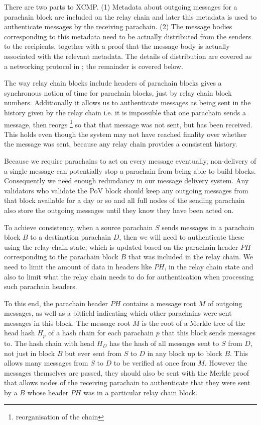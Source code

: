 There are two parts to XCMP. (1) Metadata about outgoing messages for a parachain block are included on the relay chain and later this metadata is used to authenticate messages by the receiving parachain. (2) The message bodies corresponding to this metadata need to be actually distributed from the senders to the recipients, together with a proof that the message body is actually associated with the relevant metadata. The details of distribution are covered as a networking protocol in ; the remainder is covered below.

The way relay chain blocks include headers of parachain blocks gives a synchronous notion of time for parachain blocks, just by relay chain block numbers. Additionally it allows us to authenticate messages as being sent in the history given by the relay chain i.e. it is impossible that one parachain sends a message, then reorgs \footnote{reorganisation of the chain} so that that message was not sent, but has been received. This holds even though the system may not have reached finality over whether the message was sent, because any relay chain provides a consistent history.

Because we require parachains to act on every message eventually, non-delivery of a single message can potentially stop a parachain from being able to build blocks. Consequently we need enough redundancy in our message delivery system. Any validators who validate the PoV block should keep any outgoing messages from that block available for a day or so and all full nodes of the sending parachain also store the outgoing messages until they know they have been acted on.

To achieve consistency, when a source parachain $S$ sends messages in a parachain block $B$ to a destination parachain $D$, then we will need to authenticate these using the relay chain state, which is updated based on the parachain header $PH$ corresponding to the parachain block $B$ that was included in the relay chain. We need to limit the amount of data in headers like $PH$, in the relay chain state and also to limit what the relay chain needs to do for authentication when processing such parachain headers.

To this end, the parachain header $PH$ contains a message root $M$ of outgoing messages, as well as a bitfield indicating which other parachains were sent messages in this block.
The message root $M$ is the root of a Merkle tree of the head hash $H_p$ of a hash chain for each parachain $p$ that this block sends messages to.  The hash chain with head $H_D$ has the hash of all messages sent to $S$ from $D$, not just in block $B$ but ever sent from $S$ to $D$ in any block up to block $B$. This allows many messages from $S$ to $D$  to be verified at once from $M$. However the messages themselves are passed, they should also be sent with the Merkle proof that allows nodes of the receiving parachain
to authenticate that they were sent by a $B$ whose header  $PH$ was in a particular relay chain block.


